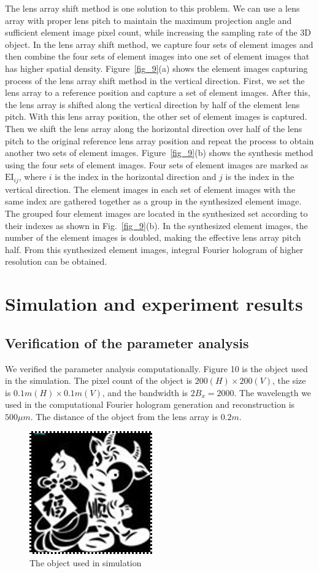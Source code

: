 \documentclass[10pt,letterpaper]{article}
\begin{document}
The lens array shift method is one solution to this problem. We can use a lens array with proper lens pitch to maintain the maximum projection angle and sufficient element image pixel count, while increasing the sampling rate of the 3D object. In the lens array shift method, we capture four sets of element images and then combine the four sets of element images into one set of element images that has higher spatial density. Figure~\ref{fig_9}(a) shows the element images capturing process of the lens array shift method in the vertical direction. First, we set the lens array to a reference position and capture a set of element images. After this, the lens array is shifted along the vertical direction by half of the element lens pitch. With this lens array position, the other set of element images is captured. Then we shift the lens array along the horizontal direction over half of the lens pitch to the original reference lens array position and repeat the process to obtain another two sets of element images. Figure~\ref{fig_9}(b) shows the synthesis method using the four sets of element images. Four sets of element images are marked as $\text{EI}_{ij}$, where $i$ is the index in the horizontal direction and $j$ is the index in the vertical direction. The element images in each set of element images with the same index are gathered together as a group in the synthesized element image. The grouped four element images are located in the synthesized set according to their indexes as shown in Fig.~\ref{fig_9}(b). In the synthesized element images, the number of the element images is doubled, making the effective lens array pitch half. From this synthesized element images, integral Fourier hologram of higher resolution can be obtained.

\section{Simulation and experiment results}

\subsection{Verification of the parameter analysis}
We verified the parameter analysis computationally. Figure 10 is the object used in the simulation. The pixel count of the object is $200(H)\times200(V)$, the size is $0.1m(H)\times0.1m(V)$, and the bandwidth is $2B_x=2000$. The wavelength we used in the computational Fourier hologram generation and reconstruction is $500μm$. The distance of the object from the lens array is $0.2m$.
\begin{figure}[htbp]
\centering\includegraphics[width=.25\columnwidth]{fig_10}
\caption{The object used in simulation}
\label{fig_10}
\end{figure}
\end{document}
